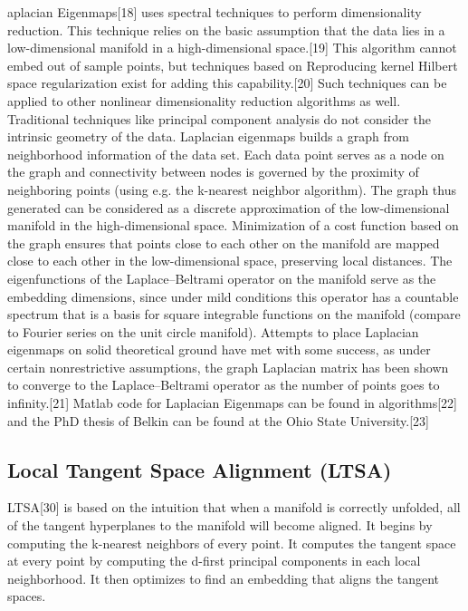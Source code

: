 aplacian Eigenmaps[18] uses spectral techniques to perform dimensionality reduction. This technique relies on the basic assumption that the data lies in a low-dimensional manifold in a high-dimensional space.[19] This algorithm cannot embed out of sample points, but techniques based on Reproducing kernel Hilbert space regularization exist for adding this capability.[20] Such techniques can be applied to other nonlinear dimensionality reduction algorithms as well.
Traditional techniques like principal component analysis do not consider the intrinsic geometry of the data. Laplacian eigenmaps builds a graph from neighborhood information of the data set. Each data point serves as a node on the graph and connectivity between nodes is governed by the proximity of neighboring points (using e.g. the k-nearest neighbor algorithm). The graph thus generated can be considered as a discrete approximation of the low-dimensional manifold in the high-dimensional space. Minimization of a cost function based on the graph ensures that points close to each other on the manifold are mapped close to each other in the low-dimensional space, preserving local distances. The eigenfunctions of the Laplace–Beltrami operator on the manifold serve as the embedding dimensions, since under mild conditions this operator has a countable spectrum that is a basis for square integrable functions on the manifold (compare to Fourier series on the unit circle manifold). Attempts to place Laplacian eigenmaps on solid theoretical ground have met with some success, as under certain nonrestrictive assumptions, the graph Laplacian matrix has been shown to converge to the Laplace–Beltrami operator as the number of points goes to infinity.[21] Matlab code for Laplacian Eigenmaps can be found in algorithms[22] and the PhD thesis of Belkin can be found at the Ohio State University.[23]




\subsection{Local Tangent Space Alignment (LTSA)}
LTSA[30] is based on the intuition that when a manifold is correctly unfolded, all of the tangent hyperplanes to the manifold will become aligned. It begins by computing the k-nearest neighbors of every point. It computes the tangent space at every point by computing the d-first principal components in each local neighborhood. It then optimizes to find an embedding that aligns the tangent spaces.

